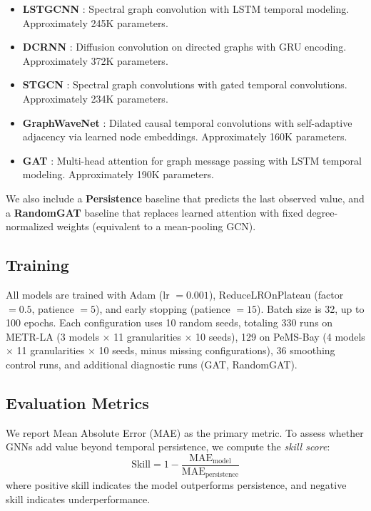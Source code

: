 \documentclass[letterpaper]{article}
\begin{document}
\begin{itemize}
    \item \textbf{LSTGCNN} \cite{kipf2017semi}: Spectral graph convolution with LSTM temporal modeling. Approximately 245K parameters.
    \item \textbf{DCRNN} \cite{li2018diffusion}: Diffusion convolution on directed graphs with GRU encoding. Approximately 372K parameters.
    \item \textbf{STGCN} \cite{yu2018spatio}: Spectral graph convolutions with gated temporal convolutions. Approximately 234K parameters.
    \item \textbf{GraphWaveNet} \cite{wu2019graph}: Dilated causal temporal convolutions with self-adaptive adjacency via learned node embeddings. Approximately 160K parameters.
    \item \textbf{GAT} \cite{velickovic2018graph}: Multi-head attention for graph message passing with LSTM temporal modeling. Approximately 190K parameters.
\end{itemize}

We also include a \textbf{Persistence} baseline that predicts the last observed value, and a \textbf{RandomGAT} baseline that replaces learned attention with fixed degree-normalized weights (equivalent to a mean-pooling GCN).

\subsection{Training}
\label{sec:training}

All models are trained with Adam (lr $= 0.001$), ReduceLROnPlateau (factor $= 0.5$, patience $= 5$), and early stopping (patience $= 15$). Batch size is 32, up to 100 epochs. Each configuration uses 10 random seeds, totaling 330 runs on METR-LA (3 models $\times$ 11 granularities $\times$ 10 seeds), 129 on PeMS-Bay (4 models $\times$ 11 granularities $\times$ 10 seeds, minus missing configurations), 36 smoothing control runs, and additional diagnostic runs (GAT, RandomGAT).

\subsection{Evaluation Metrics}

We report Mean Absolute Error (MAE) as the primary metric. To assess whether GNNs add value beyond temporal persistence, we compute the \textit{skill score}:
\begin{equation}
    \text{Skill} = 1 - \frac{\text{MAE}_\text{model}}{\text{MAE}_\text{persistence}}
\end{equation}
where positive skill indicates the model outperforms persistence, and negative skill indicates underperformance.
\end{document}
